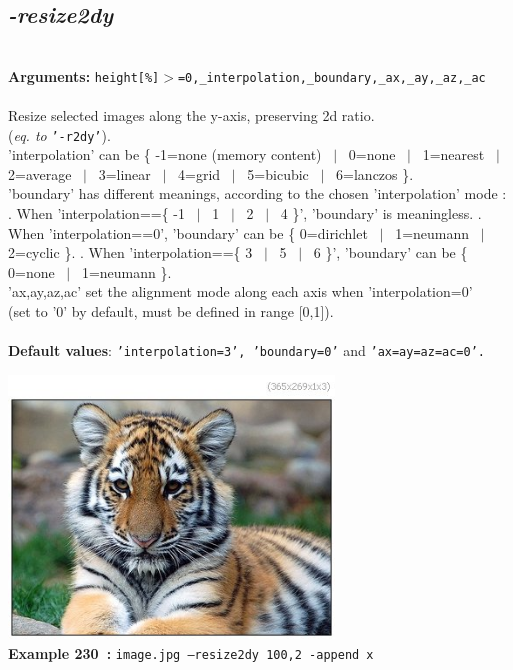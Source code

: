 \documentclass[a4paper,11pt,twoside]{book}
\begin{document}
\subsection{\emph{-resize2dy} }\vspace*{-0.5em}
~\\\textbf{Arguments: } 
{\small \texttt{height[\%]$>$=0,\_interpolation,\_boundary,\_ax,\_ay,\_az,\_ac}}\\~\\
Resize selected images along the y-axis, preserving 2d ratio.
~\\(\emph{eq. to} {\small \texttt{'-r2dy'}}).
~\\'interpolation' can be \{ -1=none (memory content) ~$|$~ 0=none ~$|$~ 1=nearest ~$|$~ 2=average ~$|$~ 3=linear ~$|$~ 4=grid ~$|$~ 5=bicubic ~$|$~ 6=lanczos \}.
~\\'boundary' has different meanings, according to the chosen 'interpolation' mode :
. When 'interpolation==\{ -1 ~$|$~ 1 ~$|$~ 2 ~$|$~ 4 \}', 'boundary' is meaningless.
. When 'interpolation==0', 'boundary' can be \{ 0=dirichlet ~$|$~ 1=neumann ~$|$~ 2=cyclic \}.
. When 'interpolation==\{ 3 ~$|$~ 5 ~$|$~ 6 \}', 'boundary' can be \{ 0=none ~$|$~ 1=neumann \}.
~\\'ax,ay,az,ac' set the alignment mode along each axis when 'interpolation=0'
~\\(set to '0' by default, must be defined in range [0,1]).
~\\~\\\textbf{Default values}: {\small \texttt{'interpolation=3', 'boundary=0'} and \texttt{'ax=ay=az=ac=0'.}}
\begin{center}\includegraphics[keepaspectratio=true,height=7cm,width=\textwidth]{img/gmic_def230.jpg}\\
{\footnotesize \textbf{Example 230~:} \texttt{image.jpg --resize2dy 100,2 -append x}}
\end{center}
\end{document}
